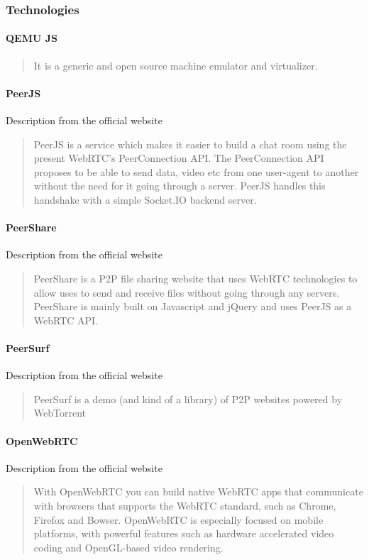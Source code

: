 
\subsubsection{Technologies}
\paragraph{QEMU JS}
\cite{Bellard2015JavascriptEmulator}
\blockquote{It is a generic and open source machine emulator and virtualizer.}

\paragraph{PeerJS}
Description from the official website \cite{SwitchPeerJS}
\blockquote{PeerJS is a service which makes it easier to build a chat room using the present WebRTC's PeerConnection API. The PeerConnection API proposes to be able to send data, video etc from one user-agent to another without the need for it going through a server. PeerJS handles this handshake with a simple Socket.IO backend server.}

\paragraph{PeerShare}
Description from the official website \cite{CuonicPeerShare}
\blockquote{PeerShare is a P2P file sharing website that uses WebRTC technologies to allow uses to send and receive files without going through any servers. PeerShare is mainly built on Javascript and jQuery and uses PeerJS as a WebRTC API.}

\paragraph{PeerSurf}
Description from the official website \cite{HaywardPeerSurf}
\blockquote{PeerSurf is a demo (and kind of a library) of P2P websites powered by WebTorrent}

\paragraph{OpenWebRTC}
Description from the official website \cite{OpenWebRTCOpenWebRTC}
\blockquote{With OpenWebRTC you can build native WebRTC apps that communicate with browsers that supports the WebRTC standard, such as Chrome, Firefox and Bowser. OpenWebRTC is especially focused on mobile platforms, with powerful features such as hardware accelerated video coding and OpenGL-based video rendering.}

